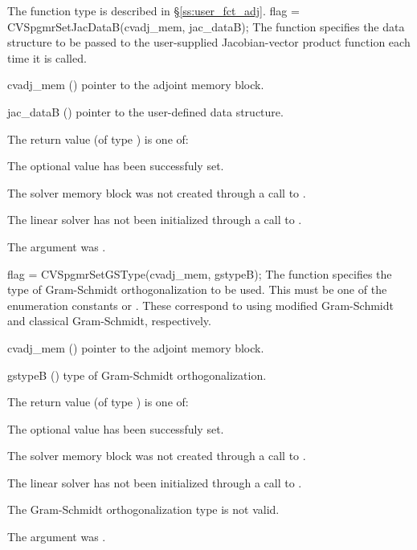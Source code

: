 {
  The function type  is described in \S\ref{ss:user_fct_adj}.
}
{
  flag = CVSpgmrSetJacDataB(cvadj\_mem, jac\_dataB);
}
{
  The function  specifies the data structure
  to be passed to the user-supplied Jacobian-vector product
  function each time it is called.
}
{
  \begin{args}
  \item[cvadj\_mem] ()
    pointer to the adjoint memory block.
  \item[jac\_dataB] ()
     pointer to the user-defined data structure.
  \end{args}
}
{
  The return value  (of type ) is one of:
  \begin{args}
  \item[\Id{CVSPGMR\_SUCCESS}] 
    The optional value has been successfuly set.
  \item[\Id{CVSPGMR\_MEM\_NULL}]
    The {\cvodes} solver memory block was not created through a call to .
  \item[\Id{CVSPGMR\_LMEM\_NULL}]
    The {\cvspgmr} linear solver has not been initialized through a call to .
  \item[\Id{CV\_ADJMEM\_NULL}]
    The  argument was .
  \end{args}
}
{}
{
  flag = CVSpgmrSetGSType(cvadj\_mem, gstypeB);
}
{
  The function  specifies the type of
  Gram-Schmidt orthogonalization to be used. 
  This must be one of the enumeration constants 
  or . These correspond to using modified Gram-Schmidt 
  and classical Gram-Schmidt, respectively. 
}
{
  \begin{args}
  \item[cvadj\_mem] ()
    pointer to the adjoint memory block.
  \item[gstypeB] ()
    type of Gram-Schmidt orthogonalization.
  \end{args}
}
{
  The return value  (of type ) is one of:
  \begin{args}
  \item[\Id{CVSPGMR\_SUCCESS}] 
    The optional value has been successfuly set.
  \item[\Id{CVSPGMR\_MEM\_NULL}]
    The {\cvodes} solver memory block was not created through a call to .
  \item[\Id{CVSPGMR\_LMEM\_NULL}]
    The {\cvspgmr} linear solver has not been initialized through a call to .
  \item[\Id{CVSPGMR\_ILL\_INPUT}]
    The Gram-Schmidt orthogonalization type  is not valid.
  \item[\Id{CV\_ADJMEM\_NULL}]
    The  argument was .
  \end{args}
}
